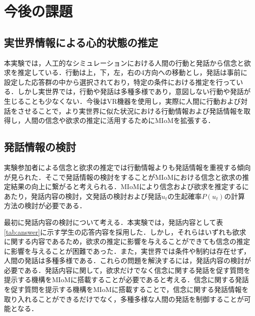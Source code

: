 \chapter{今後の課題}

\section{実世界情報による心的状態の推定}
本実験では，人工的なシミュレーションにおける人間の行動と発話から信念と欲求を推定している．行動は上，下，左，右の4方向への移動とし，発話は事前に設定した応答群の中から選択されており，特定の条件における推定を行っている．しかし実世界では，行動や発話は多種多様であり，意図しない行動や発話が生じることも少なくない．今後はVR機器を使用し，実際に人間に行動および対話をさせることで，より実世界に似た状況における行動情報および発話情報を取得し，人間の信念や欲求の推定に活用するためにMIoMを拡張する．

\section{発話情報の検討}

\par
実験参加者による信念と欲求の推定では行動情報よりも発話情報を重視する傾向が見られた．そこで発話情報の検討をすることがMIoMにおける信念と欲求の推定結果の向上に繋がると考えられる．MIoMにより信念および欲求を推定するにあたり，発話内容の検討，文発話の検討および発話$u_t$の生起確率$P(u_t)$の計算方法の検討が必要である．

\par
最初に発話内容の検討について考える．本実験では，発話内容として表\ref{tab:answer}に示す学生の応答内容を採用した．しかし，それらはいずれも欲求に関する内容であるため，欲求の推定に影響を与えることができても信念の推定に影響を与えることが困難であった．また，実世界では条件や制約は存在せず，人間の発話は多種多様である．これらの問題を解決するには，発話内容の検討が必要である．発話内容に関して，欲求だけでなく信念に関する発話を促す質問を提示する機構をMIoMに搭載することが必要であると考える．信念に関する発話を促す質問を提示する機構をMIoMに搭載することで，信念に関する発話情報を取り入れることができるだけでなく，多種多様な人間の発話を制御することが可能となる．

